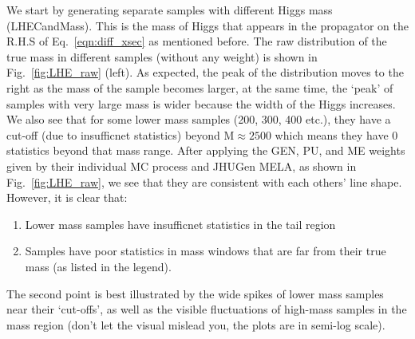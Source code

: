 We start by generating separate samples with different Higgs mass (LHECandMass).
This is the mass of Higgs that appears in the propagator on 
the R.H.S of Eq.~\ref{eqn:diff_xsec} as mentioned before. The raw distribution of the true mass
in different samples (without any weight) is shown in Fig.~\ref{fig:LHE_raw} (left). As expected, 
the peak of the distribution moves to the right as the mass of the sample becomes larger, at the
same time, the `peak' of samples with very large mass is wider because the width of the Higgs increases.
We also see that for some lower mass
samples (200, 300, 400 etc.), they have a cut-off (due to insufficnet statistics) beyond $\mathrm{M}\approx2500$ which means they have 0
statistics beyond that mass range. After applying the GEN, PU, and ME weights given by their
individual MC process and JHUGen MELA, as shown in Fig.~\ref{fig:LHE_raw},
we see that they are consistent with each others' line shape. However, it is clear
that:
\begin{enumerate}[label=(\roman*)]
    \item Lower mass samples have insufficnet statistics in the tail region
    \item Samples have poor statistics in mass windows that are 
        far from their true mass (as listed in the legend).
\end{enumerate}
The second point is best illustrated by the wide spikes of lower mass samples near their `cut-offs',
as well as the visible fluctuations of high-mass samples in the mass region (don't let the 
visual mislead you, the plots are in semi-log scale).
